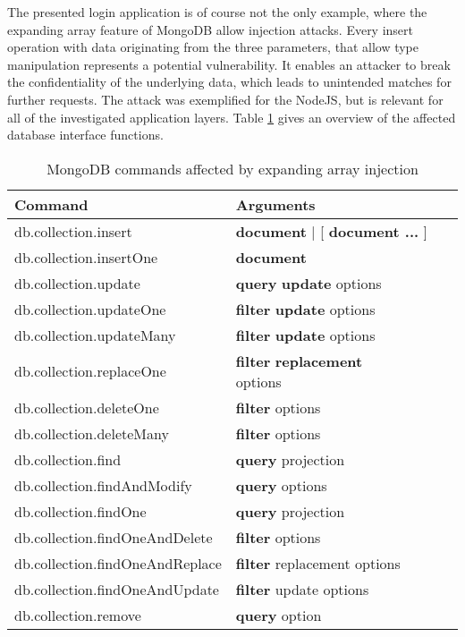 The presented login application is of course not the only example, where the expanding array feature of MongoDB allow injection attacks. Every insert operation with data originating from the three parameters, that allow type manipulation represents a potential vulnerability. It enables an attacker to break the confidentiality of the underlying data, which leads to unintended matches for further requests. The attack was exemplified for the NodeJS, but is relevant for all of the investigated application layers. Table \ref{tab:mongo_commands_affected_expanding_array} gives an overview of the affected database interface functions.\\

\begin{table}[h]
 \sffamily
 \centering
 \begin{tabular}{lllll}
  \textbf{Command} & \textbf{Arguments} \\ \hline
  db.collection.insert            & \multicolumn{3}{l}{\textcolor{dark-red}{\textbf{document}} | [ \textcolor{dark-red}{\textbf{document ... }} ] } \\
  db.collection.insertOne         & \textcolor{dark-red}{\textbf{document}} \\ 
  db.collection.update            & \textcolor{dark-blue}{\textbf{query}} \textcolor{dark-red}{\textbf{update}} options \\
  db.collection.updateOne         & \textcolor{dark-blue}{\textbf{filter}} \textcolor{dark-red}{\textbf{update}} options \\
  db.collection.updateMany        & \textcolor{dark-blue}{\textbf{filter}} \textcolor{dark-red}{\textbf{update}} options \\
  db.collection.replaceOne        & \textcolor{dark-blue}{\textbf{filter}} \textcolor{dark-red}{\textbf{replacement}} options \\\hdashline
  db.collection.deleteOne         & \textcolor{dark-blue}{\textbf{filter}} options \\
  db.collection.deleteMany        & \textcolor{dark-blue}{\textbf{filter}} options \\
  db.collection.find              & \textcolor{dark-blue}{\textbf{query}} projection \\
  db.collection.findAndModify     & \textcolor{dark-blue}{\textbf{query}} options \\
  db.collection.findOne           & \textcolor{dark-blue}{\textbf{query}} projection \\
  db.collection.findOneAndDelete  & \textcolor{dark-blue}{\textbf{filter}} options \\
  db.collection.findOneAndReplace & \textcolor{dark-blue}{\textbf{filter}} replacement options \\
  db.collection.findOneAndUpdate  & \textcolor{dark-blue}{\textbf{filter}} update options \\
  db.collection.remove            & \textcolor{dark-blue}{\textbf{query}}  option \\
  \bottomrule 
 \end{tabular}
 \caption{MongoDB commands affected by expanding array injection}
 \label{tab:mongo_commands_affected_expanding_array}
\end{table}

